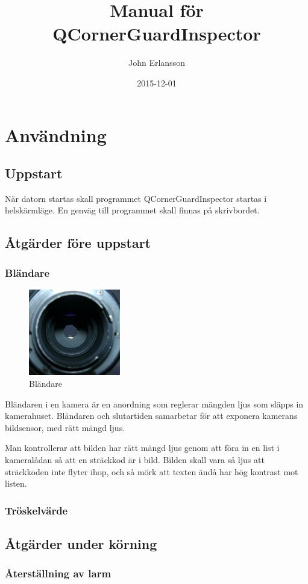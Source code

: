 \documentclass[a4paper]{article}
\title{Manual för QCornerGuardInspector}
\author{John Erlansson}
\date{2015-12-01}
\begin{document}
\maketitle
\tableofcontents
\newpage


\section{Användning}
	\subsection{Uppstart}
		När datorn startas skall programmet QCornerGuardInspector startas i
		helskärmläge.
		En genväg till programmet skall finnas på skrivbordet.

	\subsection{Åtgärder före uppstart}
		\subsubsection{Bländare}
			\begin{figure}
				\centering
				\includegraphics[width=4cm]{aperture.jpg}
				\caption{Bländare}
			\end{figure}
			Bländaren i en kamera är en anordning som reglerar mängden ljus som släpps in
			kamerahuset. Bländaren och slutartiden samarbetar för att exponera kamerans
			bildsensor, med rätt mängd ljus.
			
			Man kontrollerar att bilden har rätt mängd ljus genom att föra in en list i
			kameralådan så att en sträckkod är i bild. Bilden skall vara så ljus att
			sträckkoden inte flyter ihop, och så mörk att texten ändå har hög kontrast
			mot listen.

\subsubsection{Tröskelvärde}
		
	\subsection{Åtgärder under körning}
		\subsubsection{Återställning av larm}
\end{document}
